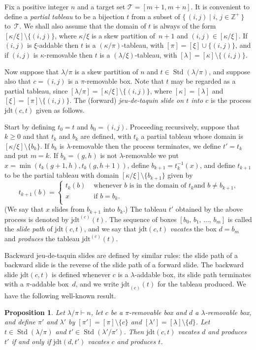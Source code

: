 \documentclass[10pt]{amsart}
\newtheorem{prop}[theo]{Proposition}
\theoremstyle{definition}
\newcommand{\jdt}{\mathrm{jdt}}
\DeclareMathOperator{\STD}{Std}
\begin{document}
Fix a positive integer $n$ and a target set $\mathcal{T}=[m+1,m+n]$. It
is convenient to define a \emph{partial tableau} to be a bijection $t$
from a subset of $\{\,(i,j)\mid i,\,j\in\mathbb{Z}^+\,\}$ to~$\mathcal{T}$.
We shall also assume that the domain of $t$ is always of the form
$[\kappa/\xi]\setminus\{(i,j)\}$, where $\kappa/\xi$ is a skew partition
of~$n+1$ and $(i,j)\in[\kappa/\xi]$. If $(i,j)$ is $\xi$-addable
then $t$ is a $(\kappa/\pi)$-tableau, with
$[\pi]=[\xi]\cup\{(i,j)\}$, and if $(i,j)$ is $\kappa$-removable
then $t$ is a $(\lambda/\xi)$-tableau, with
$[\lambda]=[\kappa]\setminus\{(i,j)\}$.

Now suppose that $\lambda/\pi$ is a skew partition of $n$ and
$t\in\STD(\lambda/\pi)$, and suppose also that $c=(i,j)$
is a $\pi$-removable box.
Note that $t$ may be regarded as a partial tableau, since
$[\lambda/\pi]=[\kappa/\xi]\setminus\{(i,j)\}$, where
$[\kappa]=[\lambda]$ and $[\xi]=[\pi]\setminus\{(i,j)\}$.
The (forward) \emph{jeu-de-taquin slide on $t$ into $c$} is the
process $\jdt(c,t)$ given as follows.

Start by defining $t_0=t$ and $b_0 = (i,j)$. Proceeding recursively,
suppose that $k\geqslant 0$ and that $t_{k}$
and $b_{k}$ are defined, with $t_{k}$ a partial tableau whose
domain is $[\kappa/\xi]\setminus\{b_{k}\}$. If $b_{k}$ is
$\lambda$-removable then the process terminates, we define
$t'=t_{k}$ and put $m=k$. If $b_{k}=(g,h)$ is not
$\lambda$-removable we put $x=\min(t_k(g+1,h),t_k(g,h+1))$, define
$b_{k+1}=t_{k}^{-1}(x)$, and define $t_{k+1}$ to be the partial
tableau with domain $[\kappa/\xi]\setminus\{b_{k+1}\}$ given by
\[
t_{k+1}(b)=
\begin{cases}t_{k}(b)&\text{ whenever $b$ is in the domain of $t_{k}$
and $b\ne b_{k+1}$,}\\
x&\text{ if $b=b_{k}$.}\\
\end{cases}
\]
(We say that $x$ slides from $b_{k+1}$ into $b_{k}$.)
The tableau $t'$ obtained by the above process is denoted by $\jdt^{(c)}(t)$.
The sequence of boxes $[b_0,\,b_1,\,\ldots,\,b_m]$
is called the \emph{slide path} of $\jdt(c,t)$, and we say that
$\jdt(c,t)$ \emph{vacates} the box $d=b_m$ and \emph{produces}
the tableau $\jdt^{(c)}(t)$.

Backward jeu-de-taquin slides are defined by similar rules: the slide path of a backward
slide is the reverse of the slide path of a forward slide. The backward slide $\jdt(c,t)$
is defined whenever $c$ is a $\lambda$-addable box, its slide path terminates with
a $\pi$-addable box~$d$, and we write $\jdt_{(c)}(t)$ for the tableau produced.
We have the following well-known result.
\begin{prop}\label{forwardbackward}
Let $\lambda/\pi\vdash n$, let $c$ be a $\pi$-removable box and $d$ a
$\lambda$-removable box, and define $\pi'$ and $\lambda'$ by
$[\pi']=[\pi]\setminus\{c\}$ and $[\lambda']=[\lambda]\setminus\{d\}$.
Let $t\in\STD(\lambda/\pi)$ and $t'\in\STD(\lambda'/\pi')$. Then
$\jdt(c,t)$ vacates $d$ and produces $t'$ if and only if
$\jdt(d,t')$ vacates $c$ and produces $t$.
\end{prop}
\end{document}

